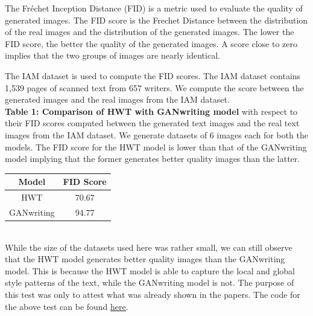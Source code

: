 \documentclass[10pt,twocolumn,letterpaper]{article}
\begin{document}
The Fréchet Inception Distance (FID) is a metric used to evaluate the quality of generated images. The FID score is the Frechet Distance between the distribution of the real images and the distribution of the generated images. The lower the FID score, the better the quality of the generated images. A score close to zero implies that the two groups of images are nearly identical. 

The IAM dataset \cite{IAM} is used to compute the FID scores. The IAM dataset contains 1,539 pages of scanned text from 657 writers. We compute the score between the generated images and the real images from the IAM dataset.\\



\textbf{Table 1: Comparison of HWT\cite{HWT} with GANwriting\cite{GAN-1} model}
 with respect to their FID scores computed between the generated text images and the real text images from the IAM dataset. We generate datasets of 6 images each for both the models. The FID score for the HWT model is lower than that of the GANwriting model implying that the former generates better quality images than the latter.
\begin{table}[h]
  \begin{center}
    \begin{tabular}{|c|c|}
      \hline
      \textbf{Model} & \textbf{FID Score} \\
      \hline
      HWT & 70.67 \\
      \hline
      GANwriting & 94.77 \\
      \hline
    \end{tabular}
  \end{center}
\end{table}\\
While the size of the datasets used here was rather small, we can still observe that the HWT model generates better quality images than the GANwriting model. This is because the HWT model is able to capture the local and global style patterns of the text, while the GANwriting model is not. The purpose of this test was only to attest what was already shown in the papers. The code for the above test can be found \href{https://github.com/Shambu-K/handwriting-generator-model/blob/main/Comparison%20of%20models/compare_fid.ipynb}{here}.
\newline
\end{document}

